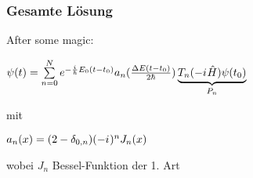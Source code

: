 \documentclass{beamer}
\newcommand{\iu}{{i\mkern1mu}} 	%
\begin{document}
\begin{frame}[t] %
  \frametitle{Gesamte Lösung}

  After some magic:

  $\psi(t) = \sum\limits_{n=0}^N e^{-\frac{\iu}{\hbar}E_0(t-t_0)} a_n(\frac{\Delta E(t-t_0)}{2\hbar}) \underbrace{T_n(-\iu\hat{H})\psi(t_0)}_{P_n}$
          
  mit

  $a_n(x) = (2-\delta_{0,n})(-\iu)^n J_n(x)$

  wobei $J_n$ Bessel-Funktion der 1. Art
\end{frame}




\end{document}
